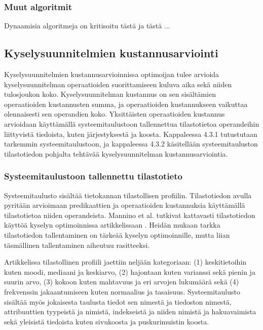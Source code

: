\documentclass[finnish]{tktltiki2}
\theoremstyle{definition}
\theoremstyle{remark}
\begin{document}
\subsubsection{Muut algoritmit}
Dynaamisia algoritmeja on kritisoitu tästä ja tästä \cite{tähän}...

\subsection{Kyselysuunnitelmien kustannusarviointi}

Kyselysuunnitelmien kustannusarvioinnissa optimoijan tulee arvioida kyselysuunnitelman operaatioiden suorittamiseen kuluva aika sekä niiden tulosjoukon koko. Kyselysuunnitelman kustannus on sen sisältämien operaatioiden kustannusten summa, ja operaatioiden kustannukseen vaikuttaa olennaisesti sen operandien koko. Yksittäisten operaatioiden kustannus arvioidaan käyttämällä systeemitaulustoon tallennettua tilastotietoa operandeihin liittyvistä tiedoista, kuten järjestyksestä ja koosta. Kappaleessa 4.3.1 tutustutaan tarkemmin systeemitaulustoon, ja kappaleessa 4.3.2 käsitellään systeemitauluston tilastotiedon pohjalta tehtävää kyselysuunnitelman kustannusarviointia.


\subsubsection{Systeemitaulustoon tallennettu tilastotieto}
Systeemitaulusto sisältää tietokannan tilastollisen profiilin. Tilastotiedon avulla pyritään arvioimaan predikaattien ja operaatioiden kustannuksia käyttämällä tilastotietoa niiden operandeista. Mannino et al. tutkivat kattavasti tilastotiedon käyttöä kyselyn optimoinnissa artikkelissaan \cite{mannino1988statistical}. Heidän mukaan tarkka tilastotiedon tallentaminen on tärkeää kyselyn optimoinnille, mutta liian täsmällinen tallentaminen aiheutuu rasitteeksi.

Artikkelissa tilastollinen profiili jaettiin neljään kategoriaan: (1) keskitietoihin kuten moodi, mediaani ja keskiarvo,  (2) hajontaan kuten varianssi sekä pienin ja suurin arvo, (3) kokoon kuten mahtavuus ja eri arvojen lukumäärä sekä (4) frekvenssin jakaantumiseen kuten normaalius ja tasaisuus. Systeemitaulusto sisältää myös jokaisesta taulusta tiedot sen nimestä ja tiedoston nimestä,  attribuuttien tyypeistä ja nimistä, indekseistä ja niiden nimistä ja hakuavaimista sekä yleisistä tiedoista kuten sivukoosta ja puskurimuistin koosta.
\end{document}
